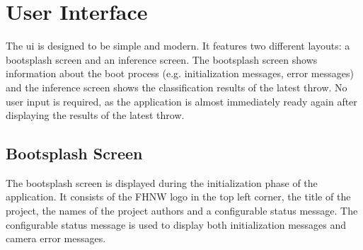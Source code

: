 \section{User Interface}
\label{sec:inference:user_interface}

The \acrfull{ui} is designed to be simple and modern.
It features two different layouts: a bootsplash screen and an inference screen.
The bootsplash screen shows information about the boot process (e.g. initialization messages, error messages) and the inference screen shows the classification results of the latest throw.
No user input is required, as the application is almost immediately ready again after displaying the results of the latest throw.

\subsection{Bootsplash Screen}
\label{subsec:inference:user_interface:bootsplash_screen}

The bootsplash screen is displayed during the initialization phase of the application.
It consists of the FHNW logo in the top left corner, the title of the project, the names of the project authors and a configurable status message.
The configurable status message is used to display both initialization messages and camera error messages.

